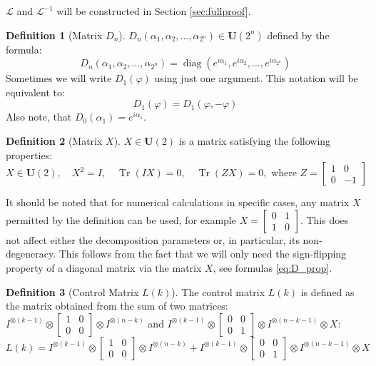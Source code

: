 \documentclass[a4paper, openany, 12pt]{article}
\theoremstyle{remark}
\theoremstyle{definition}
\newtheorem{definition}{Definition}[section]
\newcommand{\Tr}{\operatorname{Tr}}
\newcommand{\diag}{\operatorname{diag}}
\newcommand{\ot}{\otimes}
\begin{document}
$\mathcal{L}$ and $\mathcal{L}^{-1}$ will be constructed in Section \ref{sec:fullproof}.


\begin{definition}[Matrix $D_n$]
\label{def:D_n}
$D_n(\alpha_1, \alpha_2, \dots, \alpha_{2^n}) \in \mathbf{U}(2^n)$ defined by the formula:
\begin{equation}
D_{n}(\alpha_1, \alpha_2, \dots, \alpha_{2^n}) = \diag(e^{i\alpha_1},e^{i\alpha_2}, \dots, e^{i\alpha_{2^n}})
\end{equation}
Sometimes we will write $D_1(\varphi)$ using just one argument. This notation will be equivalent to:
\begin{equation}
D_1(\varphi) = D_1(\varphi,-\varphi)
\end{equation}
Also note, that $D_0(\alpha_1) = e^{i\alpha_1}$.
\end{definition}

\begin{definition}[Matrix $X$]
\label{def:X}
 $X\in\mathbf{U}(2)$ is a matrix satisfying the following properties:
\begin{equation}
X \in\mathbf{U}(2),\quad X^2 = I,\quad \Tr(IX) = 0,\quad \Tr(ZX)=0,\text{ where } Z = \begin{bmatrix}
1&0\\
0&-1
\end{bmatrix}
\end{equation}
\end{definition}

It should be noted that for numerical calculations in specific cases, any matrix $X$ permitted by the definition can be used, for example $X = \begin{bmatrix} 0&1\\1&0\end{bmatrix}$. This does not affect either the decomposition parameters or, in particular, its non-degeneracy. This follows from the fact that we will only need the sign-flipping property of a diagonal matrix via the matrix $X$, see formulas \eqref{eq:D_prop}.

\begin{definition}[Control Matrix $L(k)$]
\label{def:Lk}
The control matrix $L(k)$ is defined as the matrix obtained from the sum of two matrices: $I^{\ot (k-1)} \ot \begin{bmatrix}
1&0\\
0&0
\end{bmatrix} \ot I^{\ot (n-k)}$ and $I^{\ot (k-1)} \ot \begin{bmatrix}
0&0\\
0&1
\end{bmatrix} \ot I^{\ot (n-k-1)}\ot X$:
\begin{equation}
L(k) = I^{\ot (k-1)} \ot \begin{bmatrix}
1&0\\
0&0
\end{bmatrix} \ot I^{\ot (n-k)} +
I^{\ot (k-1)} \ot \begin{bmatrix}
0&0\\
0&1
\end{bmatrix} \ot I^{\ot (n-k-1)}\ot X
\label{eq:Lclose}
\end{equation}
\end{definition}
\end{document}
